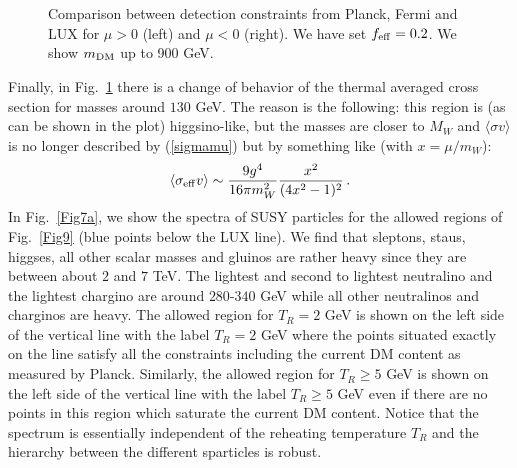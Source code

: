 \documentclass[12pt,a4paper]{book}
\begin{document}
\begin{figure}
\centering
{} \quad
{} \\
 \quad
{} \\
 \quad
{}
\caption{Comparison between detection constraints from Planck, Fermi and LUX for $\mu>0$ (left) and $\mu<0$ (right). We have set $f_{\rm eff}= 0.2$. We show $m_{{\rm DM}}$ up to 900 GeV.}
\label{Fig14}
\end{figure}

Finally, in Fig.~\ref{Fig14} there is a change of behavior of the thermal averaged cross section for masses around $130$ GeV. The reason is the following: this region is (as can be shown in the plot) higgsino-like, but the masses are closer to $M_W$ and  $\langle \sigma v \rangle$ is no longer described by (\ref{sigmamu}) but by something like (with $x=\mu/m_W$):
\begin{align}
\langle \sigma_{\rm eff} v \rangle \sim \frac{9g^4}{16 \pi m_W^2} \frac{x^2}{(4x^2-1)^2}\,.
\end{align}
In Fig.~\ref{Fig7a}, we show the spectra of SUSY particles for the allowed regions of Fig.~\ref{Fig9} (blue points below the LUX line). We find that sleptons, staus, higgses, all other scalar masses and gluinos are rather heavy since they are between about $2$ and $7$ TeV. The lightest and second to lightest neutralino and the lightest chargino are around $280$-$340$ GeV while all other neutralinos and charginos are heavy. The allowed region for $T_R=2$ GeV is shown on the left side of the vertical line with the label $T_R=2$ GeV where the points situated exactly on the line satisfy all the constraints including the current DM content as measured by Planck. Similarly, the allowed region for $T_R\geq 5$ GeV is shown on the left side of the vertical line with the label $T_R\geq 5$ GeV even if there are no points in this region which saturate the current DM content. Notice that the spectrum is essentially independent of the reheating temperature $T_R$ and the hierarchy between the different sparticles is 
robust.
\end{document}
